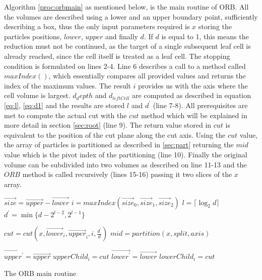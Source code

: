 \documentclass[]{article}
\begin{document}
Algorithm \ref{proc:orbmain} as mentioned below, is the main routine of ORB. All the volumes are described using a lower and an upper boundary point, sufficiently describing a box, thus the only input parameters required is $x$ storing the particles positions, $lower$, $upper$ and finally $d$.
If $d$ is equal to 1, this means the reduction must not be continued, as the target of a single subsequent leaf cell is already reached, since the cell itself is treated as a leaf cell. The stopping condition is formulated on lines 2-4. 
Line 6 describes a call to a method called $maxIndex()$, which essentially compares all provided values and returns the index of the maximum values. The result $i$ provides us with the axis where the cell volume is largest. 
$d_depth$ and $d_{leftCell}$ are computed as described in equation \ref{eq:l}, \ref{eq:d1} and the results are stored $l$ and $d^\prime$ (line 7-8). All prerequisites are met to compute the actual cut with the $cut$ method which will be explained in more detail in section \ref{sec:root} (line 9). The return value stored in $cut$ is equivalent to the position of the cut plane along the cut axis. Using the $cut$ value, the array of particles is partitioned as described in \ref{sec:part} returning the $mid$ value which is the pivot index of the partitioning (line 10).
Finally the original volume can be subdivided into two volumes as described on line 11-13 and the $ORB$ method is called recursively (lines 15-16) passing it two slices of the $x$ array.

\begin{algorithm}[H]
 	\begin{algorithmic}[1]
 		\State \Return	{}	
 		\EndIf
 		\State $\vec{size} = \vec{upper} - \vec{lower}$
 		\State $i = maxIndex(\vec{size}_0, \vec{size}_1, \vec{size}_2)$ 
 		\newline
 		\State $l = \lceil \log_2{d} \rceil$ 
 		\State $d^\prime = \min \{ d - 2^{l -2}, 2^{l - 1}\}$
 		
 		\State $cut = cut(x, \vec{lower}_{i}, \vec{upper}_{i}, i, \frac{d^\prime}{d} )$
 		\State $mid = partition(x, split, axis)$ 
 		\newline
 		
 		\State $\vec{upper^\prime} = \vec{upper}$
 		\State $upperChild_{i} = cut$
 		\State $\vec{lower^\prime} = \vec{lower}$
 		\State $lowerChild_{i} = cut$
 		\newline
 		
 		\State {} 
 		\State {}
 		\EndProcedure
 	\end{algorithmic}
 	\caption{The ORB main routine}\label{proc:orbmain}
\end{algorithm}
\end{document}
